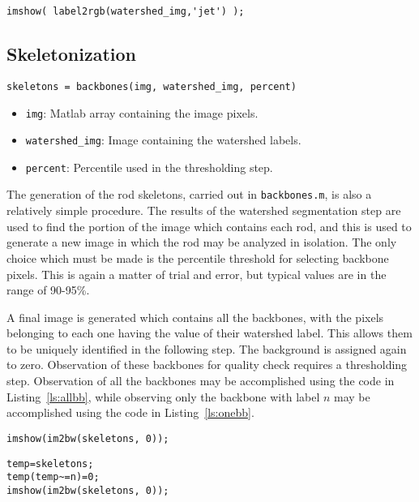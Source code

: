 \begin{lstlisting}[label=ls:showwater,caption=Observe watershed segmentation]
imshow( label2rgb(watershed_img,'jet') );
\end{lstlisting}

\subsection{Skeletonization}

\texttt{skeletons = backbones(img, watershed\_img, percent)}

\begin{itemize}
\item \texttt{img}: Matlab array containing the image pixels.
\item \texttt{watershed\_img}: Image containing the watershed labels.
\item \texttt{percent}: Percentile used in the thresholding step.
\end{itemize}

The generation of the rod skeletons, carried out in \texttt{backbones.m}, is also a relatively simple
procedure.  The results of the watershed segmentation step are used to find the portion of the 
image which contains each rod, and this is used to generate a new image in which the rod may
be analyzed in isolation. The only choice which must be made is the percentile threshold for selecting 
backbone pixels. This is again a matter of trial and error, but typical values are in the range of 90-95\%.

A final image is generated which contains all the backbones, with the pixels belonging to each one having
the value of their watershed label. This allows them to be uniquely identified in the following step. The background is 
assigned again to zero.  Observation of these backbones for quality check requires a thresholding step. Observation
of all the backbones may be accomplished using the code in Listing~\ref{ls:allbb}, while observing only the backbone 
with label $n$ may be accomplished using the code in Listing~\ref{ls:onebb}.

\begin{lstlisting}[label=ls:allbb,caption=Show all backbones as an image]
imshow(im2bw(skeletons, 0));
\end{lstlisting}

\begin{lstlisting}[label=ls:onebb,caption=Show only backbone with label $n$]
temp=skeletons;
temp(temp~=n)=0;
imshow(im2bw(skeletons, 0));
\end{lstlisting}

